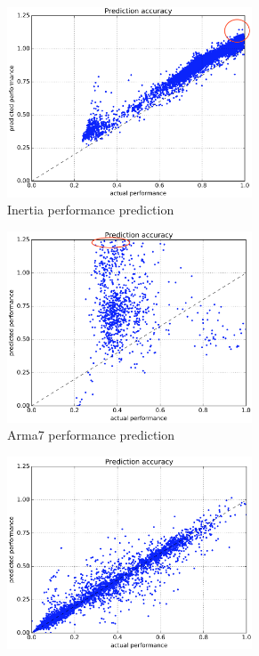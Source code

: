   \begin{figure}[bhp]
    \centering
    \begin{subfigure}[b]{1.0\linewidth}
      \centering
      \includegraphics[width=0.8\textwidth]{images/inertia_perf.png}
      \caption{Inertia performance prediction}
      \label{fig:inertia_perf}
    \end{subfigure}
    \begin{subfigure}[b]{1.0\linewidth}
      \centering
      \includegraphics[width=0.8\textwidth]{images/arm_perf.png}
      \caption{Arma7 performance prediction}
      \label{fig:arm_perf}
    \end{subfigure}
    \begin{subfigure}[b]{1.0\linewidth}
      \centering
      \includegraphics[width=0.8\textwidth]{images/overall_model.png}

\end{subfigure}
\end{figure}
